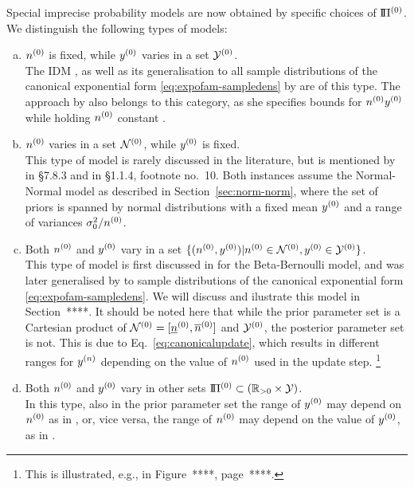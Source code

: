 Special imprecise probability models are now obtained by specific choices of $\text{I}\!\Pi^{(0)}$.
We distinguish the following types of models:
\begin{enumerate}[(a)]
\item $n^{(0)}$ is fixed, while $y^{(0)}$ varies in a set $\mathcal{Y}^{(0)}$.\\
The IDM \parencite{1996:walley::idm},
as well as its generalisation to all sample distributions of the canonical exponential form \eqref{eq:expofam-sampledens}
by \textcite{2005:quaeghebeurcooman} are of this type.
The approach by \textcite{1997:Boratynska} also belongs to this category,
as she specifies bounds for $n^{(0)} y^{(0)}$ while holding $n^{(0)}$ constant \parencite[see][p.~1973]{2012:benavolizaffalon}.
\item $n^{(0)}$ varies in a set $\mathcal{N}^{(0)}$, while $y^{(0)}$ is fixed.\\
This type of model is rarely discussed in the literature,
but is mentioned by \textcite{1991:walley} in {\S 7.8.3} and in {\S 1.1.4}, footnote no.~10.
Both instances assume the Normal-Normal model as described in Section~\ref{sec:norm-norm},
where the set of priors is spanned by normal distributions with a fixed mean $y^{(0)}$ and a range of variances $\sigma_0^2 / n^{(0)}$.
\item Both $n^{(0)}$ and $y^{(0)}$ vary in a set $\{ (n^{(0)}, y^{(0)}) \vert n^{(0)} \in \mathcal{N}^{(0)}, y^{(0)} \in \mathcal{Y}^{(0)} \}$.\\
This type of model is first discussed in \textcite[\S 5.4.3]{1991:walley} for the Beta-Bernoulli model,
and was later generalised by \textcite{Walter2009a}
to sample distributions of the canonical exponential form \eqref{eq:expofam-sampledens}.
We will discuss and ilustrate this model in Section~****.
It should be noted here that while the prior parameter set is a Cartesian product of $\mathcal{N}^{(0)} = [\underline{n}^{(0)}, \overline{n}^{(0)}]$ and $\mathcal{Y}^{(0)}$,
the posterior parameter set is not.
This is due to Eq.~\eqref{eq:canonicalupdate},
which results in different ranges for $y^{(n)}$ depending on the value of $n^{(0)}$ used in the update step.%
\footnote{This is illustrated, e.g., in Figure~****, page~****.}
\item Both $n^{(0)}$ and $y^{(0)}$ vary in other sets $\text{I}\!\Pi^{(0)} \subset (\mathbb{R}_{>0} \times \mathcal{Y})$.\\
In this type, also in the prior parameter set the range of $y^{(0)}$ may depend on $n^{(0)}$ as in \textcite[\S 2.3]{Walter2011a},
or, vice versa, the range of $n^{(0)}$ may depend on the value of $y^{(0)}$, as in \textcite{2012:benavolizaffalon}.
\end{enumerate}


